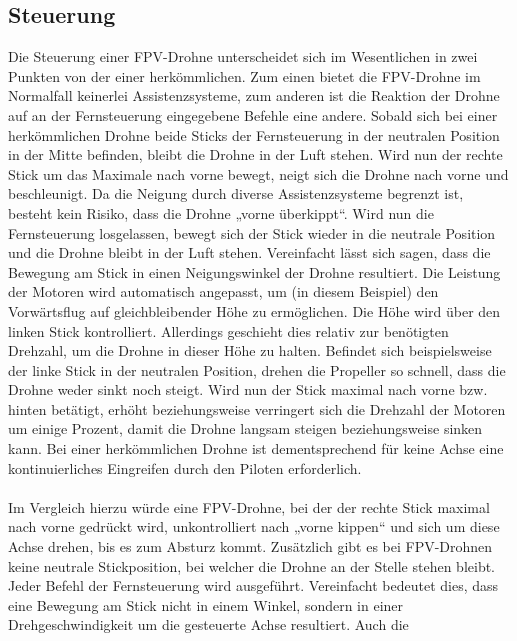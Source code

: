     \newpage
    \subsection[Steuerung]{Steuerung}
        Die Steuerung einer FPV-Drohne unterscheidet sich im Wesentlichen in zwei Punkten von der einer
        herkömmlichen. Zum einen bietet die FPV-Drohne im Normalfall keinerlei Assistenzsysteme, zum anderen
        ist die Reaktion der Drohne auf an der Fernsteuerung eingegebene Befehle eine andere. Sobald sich
        bei einer herkömmlichen Drohne beide Sticks der Fernsteuerung in der neutralen Position in der Mitte
        befinden, bleibt die Drohne in der Luft stehen. Wird nun der rechte Stick um das Maximale nach vorne
        bewegt, neigt sich die Drohne nach vorne und beschleunigt. Da die Neigung durch diverse Assistenzsysteme
        begrenzt ist, besteht kein Risiko, dass die Drohne „vorne überkippt“. Wird nun die Fernsteuerung
        losgelassen, bewegt sich der Stick wieder in die neutrale Position und die Drohne bleibt in der Luft
        stehen. Vereinfacht lässt sich sagen, dass die Bewegung am Stick in einen Neigungswinkel der Drohne resultiert.
        Die Leistung der Motoren wird automatisch angepasst, um (in diesem Beispiel) den Vorwärtsflug auf
        gleichbleibender Höhe zu ermöglichen. Die Höhe wird über den linken Stick kontrolliert. Allerdings
        geschieht dies relativ zur benötigten Drehzahl, um die Drohne in dieser Höhe zu halten. Befindet sich
        beispielsweise der linke Stick in der neutralen Position, drehen die Propeller so schnell, dass die
        Drohne weder sinkt noch steigt. Wird nun der Stick maximal nach vorne bzw. hinten betätigt, erhöht
        beziehungsweise verringert sich die Drehzahl der Motoren um einige Prozent, damit die Drohne langsam
        steigen beziehungsweise sinken kann. Bei einer herkömmlichen Drohne ist dementsprechend für keine Achse
        eine kontinuierliches Eingreifen durch den Piloten erforderlich. \\
        \\
        Im Vergleich hierzu würde eine FPV-Drohne, bei der der rechte Stick maximal nach vorne gedrückt wird,
        unkontrolliert nach „vorne kippen“ und sich um diese Achse drehen, bis es zum Absturz kommt. Zusätzlich
        gibt es bei FPV-Drohnen keine neutrale Stickposition, bei welcher die Drohne an der Stelle stehen bleibt.
        Jeder Befehl der Fernsteuerung wird ausgeführt. Vereinfacht bedeutet dies, dass eine Bewegung am Stick
        nicht in einem Winkel, sondern in einer Drehgeschwindigkeit um die gesteuerte Achse resultiert. Auch die
